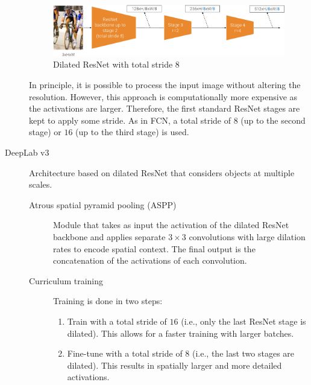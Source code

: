 \begin{description}
        \begin{figure}[H]
            \centering
            \includegraphics[width=0.9\linewidth]{./img/_dilated_resnet.pdf}
            \caption{Dilated ResNet with total stride $8$}
        \end{figure}

        \begin{remark}
            In principle, it is possible to process the input image without altering the resolution. However, this approach is computationally more expensive as the activations are larger. Therefore, the first standard ResNet stages are kept to apply some stride. As in FCN, a total stride of $8$ (up to the second stage) or $16$ (up to the third stage) is used.
        \end{remark}


    \item[DeepLab v3] 
        Architecture based on dilated ResNet that considers objects at multiple scales.

        \begin{description}
            \item[Atrous spatial pyramid pooling (ASPP)] 
                Module that takes as input the activation of the dilated ResNet backbone and applies separate $3 \times 3$ convolutions with large dilation rates to encode spatial context. The final output is the concatenation of the activations of each convolution.

            \item[Curriculum training]
                Training is done in two steps:
                \begin{enumerate}
                    \item Train with a total stride of $16$ (i.e., only the last ResNet stage is dilated). This allows for a faster training with larger batches.
                    \item Fine-tune with a total stride of $8$ (i.e., the last two stages are dilated). This results in spatially larger and more detailed activations.
                \end{enumerate}
        \end{description}


\end{description}
